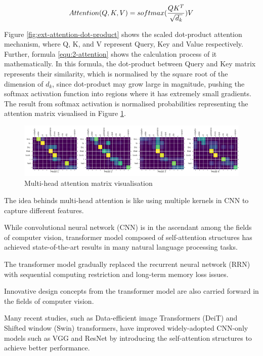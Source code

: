 \begin{equation}
    Attention(Q, K, V) = softmax(\frac{QK^T}{\sqrt{d_k}})V
    \eqcite{vaswani2017attention}
    \label{equ:2-attention}
\end{equation}

Figure \ref{fig:ext-attention-dot-product} shows the scaled dot-product attention mechanism, where Q, K, and V represent Query, Key and Value respectively.
Further, formula \ref{equ:2-attention} shows the calculation process of it mathematically.
In this formula, the dot-product between Query and Key matrix represents their similarity, which is normalised by the square root of the dimension of $d_k$, since dot-product may grow large in magnitude, pushing the softmax activation function into regions where it has extremely small gradients.
The result from softmax activation is normalised probabilities representing the attention matrix visualised in Figure  \ref{fig:ext-attention_map_portuguese}.

\begin{figure}[!ht]
    \centering
    \includegraphics[width=\textwidth]{literature/imgs/ext-attention_map_portuguese.png}
    \caption{Multi-head attention matrix visualisation \cite{tensorflow2021transformer}}
    \label{fig:ext-attention_map_portuguese}
\end{figure}

The idea behinds multi-head attention is like using multiple kernels in CNN to capture different features.

While convolutional neural network (CNN) is in the ascendant among the fields of computer vision, transformer model composed of self-attention structures has achieved state-of-the-art results in many natural language processing tasks.

\citet{devlin2019bert}

The transformer model gradually replaced the recurrent neural network (RRN) with sequential computing restriction and long-term memory loss issues.

Innovative design concepts from the transformer model are also carried forward in the fields of computer vision.

Many recent studies, such as Data-efficient image Transformers (DeiT) and Shifted window (Swin) transformers, have improved widely-adopted CNN-only models such as VGG and ResNet by introducing the self-attention structures to achieve better performance.

\citet{dai2021coatnet}

\citet{guo2021cmt}